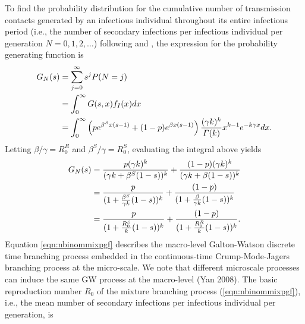 \documentclass{imammb}
\numberwithin{equation}{section}
\begin{document}
To find the probability distribution for the cumulative number of transmission contacts generated by an infectious individual throughout its entire infectious period (i.e., the number of secondary infections per infectious individual per generation $N = 0, 1,2, \dots$) following \citet{Mode2000-hp} and \citet{Yan2008}, the expression for the probability generating function is
\begin{align}\label{eqn:mixturepgf}
    G_N(s) &= \sum_{j=0}^{\infty} s^j P(N=j) \notag \\ &= \int_0^{\infty} G(s,x) f_I(x) dx \notag \\ &= \int_0^\infty \left (p e^{\beta^S x (s-1)}+(1-p)e^{\beta x (s-1)} \right) \frac{(\gamma k)^k}{\Gamma(k)} x^{k-1}e^{-k \gamma x} dx.
\end{align}
Letting $\beta /\gamma = R_0^R$ and $\beta^S /\gamma = R_0^S$, evaluating the integral above yields %
\begin{align}\label{eqn:nbinommixpgf}
    G_N(s) &=  \frac{p(\gamma k)^k}{(\gamma k + \beta^S(1-s))^k} +   \frac{(1-p)(\gamma k)^k}{(\gamma k + \beta(1-s))^k}\notag  \notag \\ &=  \frac{p}{(1 + \frac{\beta^S}{\gamma k}(1-s))^k} +   \frac{(1-p)}{(1 + \frac{\beta}{\gamma k}(1-s))^k} \notag \\&=  \frac{p}{(1 + \frac{R_0^S}{k}(1-s))^k} +   \frac{(1-p)}{(1 + \frac{R_0^R}{k}(1-s))^k}. 
\end{align}
Equation \eqref{eqn:nbinommixpgf} describes the macro-level Galton-Watson discrete time branching process embedded in the continuous-time Crump-Mode-Jagers branching process at the micro-scale.
We note that different microscale processes can induce the same GW process at the macro-level (Yan 2008). %
The basic reproduction number $R_0$ of the mixture branching process (\eqref{eqn:nbinommixpgf}), i.e., the mean number of secondary infections per infectious individual per generation, is  
\end{document}
